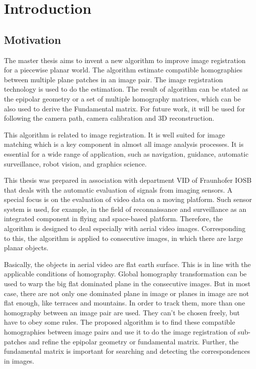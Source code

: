 \chapter{Introduction}
\section{Motivation}
The master thesis aims to invent a new algorithm to improve image registration for a piecewise planar world. The algorithm estimate compatible homographies between multiple plane patches in an image pair. The image registration technology is used to do the estimation. The result of algorithm can be stated as the epipolar geometry or a set of multiple homography matrices, which can be also used to derive the Fundamental matrix.  For future work, it will be used for following the camera path, camera calibration and 3D reconstruction.

This algorithm is related to image registration. It is well suited for image matching which is a key component in almost all image analysis processes. It is essential for a wide range of application, such as navigation, guidance, automatic surveillance, robot vision, and graphics science. 

This thesis was prepared in association with department VID of Fraunhofer IOSB that deals with the automatic evaluation of signals from imaging sensors. A special focus is on the evaluation of video data on a moving platform. Such sensor system is used, for example, in the field of reconnaissance and surveillance as an integrated component in flying and space-based platform. Therefore, the algorithm is designed to deal especially with aerial video images. Corresponding to this, the algorithm is applied to  consecutive images, in which there are large planar objects.

Basically,  the objects in aerial video are flat earth surface.  This is in line with the applicable conditions of homography. Global homography transformation can be used to warp the big flat dominated plane in the consecutive images. But in most case, there are not only one dominated plane in image or planes in  image are not flat enough, like terraces and mountains. In order to track them, more than one homography between an image pair are used. They can't be chosen freely, but have to obey some rules. The proposed algorithm is to find these compatible homographies between image pairs and use it to do the image registration of sub-patches and refine the epipolar geometry or fundamental matrix. Further, the fundamental matrix is important for searching and detecting the correspondences in images. 

